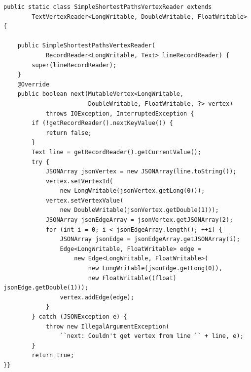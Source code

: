\begin{lstlisting}[float]
public static class SimpleShortestPathsVertexReader extends
        TextVertexReader<LongWritable, DoubleWritable, FloatWritable> {

    public SimpleShortestPathsVertexReader(
            RecordReader<LongWritable, Text> lineRecordReader) {
        super(lineRecordReader);
    }
    @Override
    public boolean next(MutableVertex<LongWritable,
                        DoubleWritable, FloatWritable, ?> vertex)
            throws IOException, InterruptedException {
        if (!getRecordReader().nextKeyValue()) {
            return false;
        }
        Text line = getRecordReader().getCurrentValue();
        try {
            JSONArray jsonVertex = new JSONArray(line.toString());
            vertex.setVertexId(
                new LongWritable(jsonVertex.getLong(0)));
            vertex.setVertexValue(
                new DoubleWritable(jsonVertex.getDouble(1)));
            JSONArray jsonEdgeArray = jsonVertex.getJSONArray(2);
            for (int i = 0; i < jsonEdgeArray.length(); ++i) {
                JSONArray jsonEdge = jsonEdgeArray.getJSONArray(i);
                Edge<LongWritable, FloatWritable> edge =
                    new Edge<LongWritable, FloatWritable>(
                        new LongWritable(jsonEdge.getLong(0)),
                        new FloatWritable((float) jsonEdge.getDouble(1)));
                vertex.addEdge(edge);
            }
        } catch (JSONException e) {
            throw new IllegalArgumentException(
                ``next: Couldn't get vertex from line `` + line, e);
        }
        return true;
}}
\end{lstlisting}

